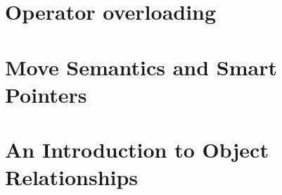 \documentclass[UTF8]{ctexart}
\begin{document}

















\newpage

\section{Operator overloading}









% 

\newpage

\section{Move Semantics and Smart Pointers}










\newpage

\section{An Introduction to Object Relationships}
\end{document}

